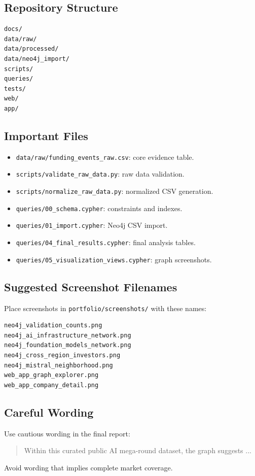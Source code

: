 \documentclass[11pt,a4paper]{article}
\begin{document}
\subsection{Repository Structure}

\begin{lstlisting}[language={}]
docs/
data/raw/
data/processed/
data/neo4j_import/
scripts/
queries/
tests/
web/
app/
\end{lstlisting}

\subsection{Important Files}

\begin{itemize}
  \item \texttt{data/raw/funding\_events\_raw.csv}: core evidence table.
  \item \texttt{scripts/validate\_raw\_data.py}: raw data validation.
  \item \texttt{scripts/normalize\_raw\_data.py}: normalized CSV generation.
  \item \texttt{queries/00\_schema.cypher}: constraints and indexes.
  \item \texttt{queries/01\_import.cypher}: Neo4j CSV import.
  \item \texttt{queries/04\_final\_results.cypher}: final analysis tables.
  \item \texttt{queries/05\_visualization\_views.cypher}: graph screenshots.
\end{itemize}

\subsection{Suggested Screenshot Filenames}

Place screenshots in \texttt{portfolio/screenshots/} with these names:

\begin{lstlisting}[language={}]
neo4j_validation_counts.png
neo4j_ai_infrastructure_network.png
neo4j_foundation_models_network.png
neo4j_cross_region_investors.png
neo4j_mistral_neighborhood.png
web_app_graph_explorer.png
web_app_company_detail.png
\end{lstlisting}

\subsection{Careful Wording}

Use cautious wording in the final report:

\begin{quote}
Within this curated public AI mega-round dataset, the graph suggests ...
\end{quote}

Avoid wording that implies complete market coverage.
\end{document}

